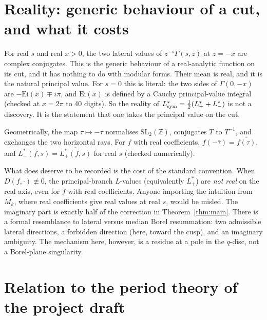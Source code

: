 \documentclass[11pt]{article}
\theoremstyle{definition}
\theoremstyle{remark}
\newcommand{\ZZ}{\mathbb{Z}}
\newcommand{\SLZ}{\mathrm{SL}_2(\ZZ)}
\begin{document}
\section{Reality: generic behaviour of a cut, and what it costs}

For real $s$ and real $x>0$, the two lateral values of $z^{-s}\Gamma(s,z)$ at $z=-x$ are complex
conjugates. This is the generic behaviour of a real-analytic function on its cut, and it has
nothing to do with modular forms. Their mean is real, and it is the natural principal value.
For $s=0$ this is literal: the two sides of $\Gamma(0,-x)$ are $-\mathrm{Ei}(x)\mp i\pi$, and
$\mathrm{Ei}(x)$ is defined by a Cauchy principal-value integral (checked at $x=2\pi$ to 40 digits).
So the reality of $L^*_{\rm sym}=\tfrac12(L^*_++L^*_-)$ is not a discovery. It is the statement that
one takes the principal value on the cut.

Geometrically, the map $\tau\mapsto-\bar\tau$ normalises $\SLZ$, conjugates $T$ to $T^{-1}$, and
exchanges the two horizontal rays. For $f$ with real coefficients, $f(-\bar\tau)=\overline{f(\tau)}$,
and $L^*_-(f,s)=\overline{L^*_+(f,s)}$ for real $s$ (checked numerically).

What does deserve to be recorded is the cost of the standard convention. When
$D(f,\cdot)\not\equiv0$, the principal-branch $L$-values (equivalently $L^*_+$) are \emph{not real} on the
real axis, even for $f$ with real coefficients. Anyone importing the intuition from $M_k$,
where real coefficients give real values at real $s$, would be misled. The imaginary part
is exactly half of the correction in Theorem~\ref{thm:main}. There is a formal resemblance to
lateral versus median Borel resummation: two admissible lateral directions, a forbidden
direction (here, toward the cusp), and an imaginary ambiguity. The mechanism here,
however, is a residue at a pole in the $q$-disc, not a Borel-plane singularity.

\section{Relation to the period theory of the project draft}\label{sec:periods}
\end{document}
